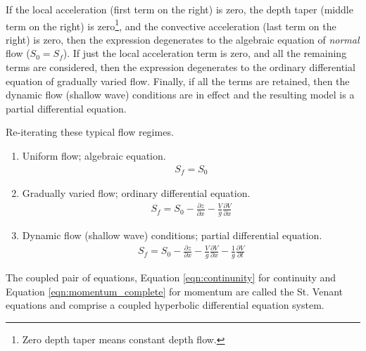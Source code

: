 If the local acceleration (first term on the right) is zero, the depth taper (middle term on the right) is zero\footnote{Zero depth taper means constant depth flow.}, and the convective acceleration (last term on the right) is zero, then the expression degenerates to the algebraic equation of \textit{normal} flow ($S_0=S_f$).  If just the local acceleration term is zero, and all the remaining terms are considered, then the expression degenerates to the ordinary differential equation of gradually varied flow.
%
Finally, if all the terms are retained,  then the dynamic flow (shallow wave) conditions are in effect and the resulting model is a partial differential equation.

Re-iterating these typical flow regimes.

\begin{enumerate}
\item Uniform flow; algebraic equation.
\begin{equation}
\begin{split}
S_f = S_0 
\end{split}
\end{equation}
\item Gradually varied flow; ordinary differential equation.
\begin{equation}
\begin{split}
S_f = S_0 -  \frac{\partial z}{\partial x} - \frac{V}{g}\frac{\partial V}{\partial x}
\end{split}
\end{equation}
\item Dynamic flow (shallow wave) conditions; partial differential equation.
\begin{equation}
\begin{split}
S_f = S_0 -  \frac{\partial z}{\partial x} - \frac{V}{g}\frac{\partial V}{\partial x}
- \frac{1}{g}\frac{\partial V }{\partial t} 
\end{split}
\end{equation}
\end{enumerate}

The coupled pair of equations, Equation \ref{eqn:continunity} for continuity and Equation \ref{eqn:momentum_complete} for momentum are called the St. Venant equations and comprise a coupled hyperbolic differential equation system.

